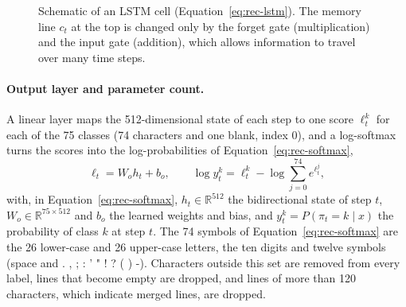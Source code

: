 \begin{figure}[h]
\centering
{}
\caption{Schematic of an LSTM cell (Equation~\ref{eq:rec-lstm}). The memory line $c_t$ at the top is changed only by the forget gate (multiplication) and the input gate (addition), which allows information to travel over many time steps.}
\label{fig:rec-lstm}
\end{figure}


\paragraph{Output layer and parameter count.}
A linear layer maps the 512-dimensional state of each step to one score $\ell_t^k$ for each of the 75 classes (74 characters and one blank, index 0), and a log-softmax turns the scores into the log-probabilities of Equation~\ref{eq:rec-softmax},
\begin{equation}
\ell_t=W_oh_t+b_o,\qquad \log y_t^k=\ell_t^k-\log\sum_{j=0}^{74}e^{\ell_t^j},
\label{eq:rec-softmax}
\end{equation}
with, in Equation~\ref{eq:rec-softmax}, $h_t\in\mathbb R^{512}$ the bidirectional state of step $t$, $W_o\in\mathbb R^{75\times512}$ and $b_o$ the learned weights and bias, and $y_t^k=P(\pi_t=k\mid x)$ the probability of class $k$ at step $t$.
The 74 symbols of Equation~\ref{eq:rec-softmax} are the 26 lower-case and 26 upper-case letters, the ten digits and twelve symbols (space and . , ; : ' " ! ? ( ) -).
Characters outside this set are removed from every label, lines that become empty are dropped, and lines of more than 120 characters, which indicate merged lines, are dropped.

